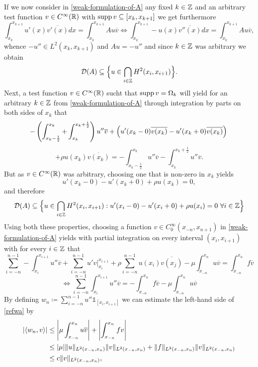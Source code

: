 If we now consider in \eqref{weak-formulation-of-A} any fixed $k \in \mathbb{Z}$ and an arbitrary test function $v \in C^{\infty}(\mathbb{R})$ with $\operatorname{supp} v \subseteq [x_{k}, x_{k+1}]$ we get furthermore
	\[ \int_{x_{k}}^{x_{k + 1}} u'(x) \overline{v'(x)} dx = \int_{x_{k}}^{x_{k+1}} A u  \overline{v} \iff \int_{x_{k}}^{x_{k+1}} - u(x) \overline{v''(x)} dx = \int_{x_{k}}^{x_{k+1}} A u \overline{v}, \]
whence $- u'' \in L^{2}(x_{k}, x_{k + 1})$ and $A u = - u''$ and since $k \in \mathbb{Z}$ was arbitrary we obtain %
	$$ \mathcal{D}(A) \subseteq \Big\{ u \in \bigcap_{i \in \mathbb{Z}} H^{2}(x_{i}, x_{i+1}) \Big\}. $$
Next, a test function $v \in C^{\infty}(\mathbb{R})$ sucht that $\operatorname{supp} v = \Omega_{k}$ will yield for an arbitrary $k \in \mathbb{Z}$ from \eqref{weak-formulation-of-A}   through integration by parts on both sides of $x_{k}$ that
	\[ -\left( \int_{x_{k}-\frac{1}{2}}^{x_{k}} + \int_{x_{k}}^{x_{k} + \frac{1}{2}}\right) u'' \overline{v} + \left( u'(x_{k}-0) \overline{v(x_{k})} - u'(x_{k} + 0) \overline{v(x_{k})} \right) \\ \]
	\[ +  \rho u(x_{k})\overline{v(x_{k})} = - \int_{x_{k} - \frac{1}{2}}^{x_{k}} u'' \overline{v} - \int_{x_{k}}^{x_{k} + \frac{1}{2}} u'' \overline{v}. \]
But as $v \in C^{\infty}(\mathbb{R})$ was arbitrary, choosing one that is non-zero in $x_{k}$ yields 
	\[ u'(x_{k}-0) - u'(x_{k}+0) + \rho u(x_{k}) = 0, \]
and therefore
	\begin{equation}
		\mathcal{D}(A) \subseteq \Big\{ u \in \bigcap_{i \in \mathbb{Z}} H^{2}(x_{i}, x_{i+1}) : u'(x_{i} - 0) - u'(x_{i} + 0) + \rho u(x_{i}) = 0 ~\forall i \in \mathbb{Z} \Big\}
	\end{equation} 
Using both these properties, choosing a function $v \in C_{0}^{\infty}(x_{-n}, x_{n+1})$ in \eqref{weak-formulation-of-A} yields with partial integration on every interval $(x_{i}, x_{i+1})$ with for every $i \in \mathbb{Z}$ that
\[ \sum_{i=-n}^{n-1} -\int_{x_{i}}^{x_{i+1}} u'' \overline{v} + \sum_{i=-n}^{n-1} u' v \Big|_{x_{i}}^{x_{i+1}} + \rho \sum_{i=-n}^{n-1} u(x_{i}) \overline{v(x_{j})} - \mu \int_{x_{-n}}^{x_{n}} u \overline{v} = \int_{x_{-n}}^{x_{n}} f \overline{v} \]
\begin{equation} 
	\iff \sum_{i=-n}^{n-1} \int_{x_{i}}^{x_{i+1}} u'' \overline{v} = - \int_{x_{-n}}^{x_{n}} f \overline{v} - \mu \int_{x_{-n}}^{x_{n}} u \overline{v} \label{refwa}
\end{equation} 
By defining $w_{n} \coloneqq \sum_{i=-n}^{n-1} u'' \mathds{1}_{[x_{i}, x_{i+1}]}$ we can estimate the left-hand side of \eqref{refwa} by
\begin{align}
	\left| \langle w_{n}, v \rangle \right| & \leq \left| \mu \int_{x_{-n}}^{x_{n}} u \overline{v} \right| + \left| \int_{x_{-n}}^{x_{n}} f v \right| \notag \\
		& \leq |\mu| \|u\|_{L^{2}(x_{-n}, x_{n})} \|v\|_{L^{2}(x_{-n}, x_{n})} + \|f\|_{L^{2}(x_{-n}, x_{n})} \|v\|_{L^{2}(x_{-n}, x_{n})} \notag \\
		& \leq c \|v\|_{L^{2}(x_{-n}, x_{n})}, \label{refwa2}
\end{align}
